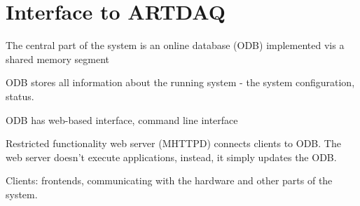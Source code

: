 \section{Interface to ARTDAQ}

The central part of the system is an online database (ODB)
implemented vis a shared memory segment

ODB stores all information about the running system -
the system configuration, status.

ODB has web-based interface, command line interface

Restricted functionality web server (MHTTPD) connects clients
to ODB. The web server doesn't execute applications, instead,
it simply updates the ODB.

Clients: frontends, communicating with the hardware and other
parts of the system.




